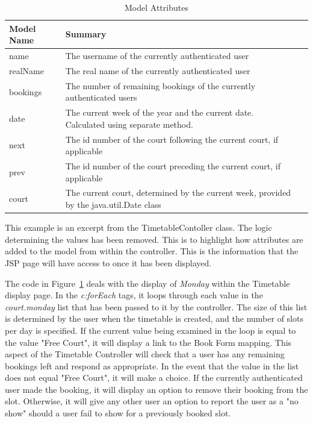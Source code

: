\begin{table}[H]
\begin{center}
\caption{Model Attributes}
    \begin{tabular}{ | l | l | p{5cm} |}
    \hline
    Model Name & Summary \\ \hline
    name & The username of the currently authenticated user  \\ \hline
    realName & The real name of the currently authenticated user\\ \hline
	bookings & The number of remaining bookings of the currently authenticated users\\ \hline
	date & The current week of the year and the current date. Calculated using separate method.\\ \hline
	next & The id number of the court following the current court, if applicable\\ \hline
    prev & The id number of the court preceding the current court, if applicable\\ \hline
	court & The current court, determined by the current week, provided by the java.util.Date class \\
    \hline
    \end{tabular}
\end{center}

\label{fig:ttmodelattributes}
\end{table}

This example is an excerpt from the TimetableContoller class. The logic determining the values has been removed. This is to highlight how attributes are added to the model from within the controller. This is the information that the JSP page will have access to once it has been displayed.

The code in Figure~\ref{fig:ttmodelattributes} deals with the display of \textit{Monday} within the Timetable display page. In the \textit{c:forEach} tags, it loops through each value in the \textit{court.monday} list that has been passed to it by the controller. The size of this list is determined by the user when the timetable is created, and the number of slots per day is specified. If the current value being examined in the loop is equal to the value "Free Court", it will display a link to the Book Form mapping. This aspect of the Timetable Controller will check that a user has any remaining bookings left and respond as appropriate. In the event that the value in the list does not equal "Free Court", it will make a choice. If the currently authenticated user made the booking, it will display an option to remove their booking from the slot. Otherwise, it will give any other user an option to report the user as a "no show" should a user fail to show for a previously booked slot. \newline

